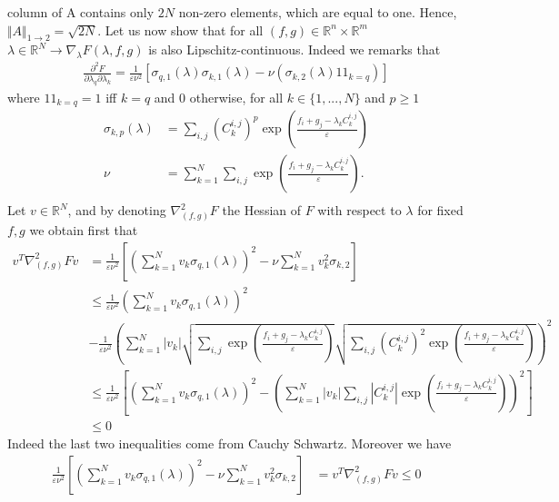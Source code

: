 \begin{prv*}
column of A contains only $2N$ non-zero elements, which
are equal to one. Hence, $\Vert A\Vert_{1\rightarrow 2} = \sqrt{2N}$. Let us now show that for all $(f,g)\in\mathbb{R}^n\times\mathbb{R}^m $ $\lambda\in\mathbb{R}^N \rightarrow \nabla_{\lambda} F(\lambda,f,g)$ is also Lipschitz-continuous. Indeed we remarks that 
\begin{align*}
    \frac{\partial^2 F}{\partial\lambda_q\partial\lambda_k} = \frac{1}{\varepsilon\nu^2}\left[\sigma_{q,1}(\lambda)\sigma_{k,1}(\lambda) - \nu (\sigma_{k,2}(\lambda)1\!\!1_{k=q})\right]
\end{align*}
where $1\!\!1_{k=q}=1$ iff $k=q$ and 0 otherwise, for all $k\in\{1,...,N\}$ and $p\geq 1$
\begin{align*}
    \sigma_{k,p}(\lambda) &= \sum_{i,j} (C_k^{i,j})^p \exp\left(\frac{f_i + g_j-\lambda_k C_k^{i,j}}{\varepsilon}\right) \\
    \nu &= \sum_{k=1}^N \sum_{i,j} \exp\left(\frac{f_i + g_j-\lambda_k C_k^{i,j}}{\varepsilon}\right).\\
\end{align*}
Let $v\in\mathbb{R}^N$, and by denoting $\nabla^2_{(f,g)}F$ the Hessian of $F$ with respect to $\lambda$ for fixed $f,g$ we obtain first that 
\begin{align*}
  v^T \nabla^2_{(f,g)}F v &=\frac{1}{\varepsilon\nu^2} \left[ \left(\sum_{k=1}^N v_k \sigma_{q,1}(\lambda)\right)^2 -\nu \sum_{k=1}^N v_k^2 \sigma_{k,2}\right]\\
  &\leq \frac{1}{\varepsilon\nu^2}\left(\sum_{k=1}^N v_k \sigma_{q,1}(\lambda)\right)^2 \\
  &-\frac{1}{\varepsilon\nu^2} \left(\sum_{k=1}^N |v_k| \sqrt{\sum_{i,j} \exp\left(\frac{f_i + g_j-\lambda_k C_k^{i,j}}{\varepsilon}\right)}  \sqrt{\sum_{i,j} (C_k^{i,j})^2 \exp\left(\frac{f_i + g_j-\lambda_k C_k^{i,j}}{\varepsilon}\right)} \right)^2 \\
  &\leq \frac{1}{\varepsilon\nu^2}\left[\left(\sum_{k=1}^N v_k \sigma_{q,1}(\lambda)\right)^2- \left(\sum_{k=1}^N |v_k| \sum_{i,j}  |C_k^{i,j}| \exp\left(\frac{f_i + g_j-\lambda_k C_k^{i,j}}{\varepsilon}\right)\right)^2\right]\\
  &\leq 0
 \end{align*}
Indeed the last two inequalities come from Cauchy Schwartz. Moreover we have
\begin{align*}
 \frac{1}{\varepsilon\nu^2} \left[ \left(\sum_{k=1}^N v_k \sigma_{q,1}(\lambda)\right)^2 -\nu \sum_{k=1}^N v_k^2 \sigma_{k,2}\right] & = v^T \nabla^2_{(f,g)}F v \leq 0   \\

\end{align*}
\end{prv*}
